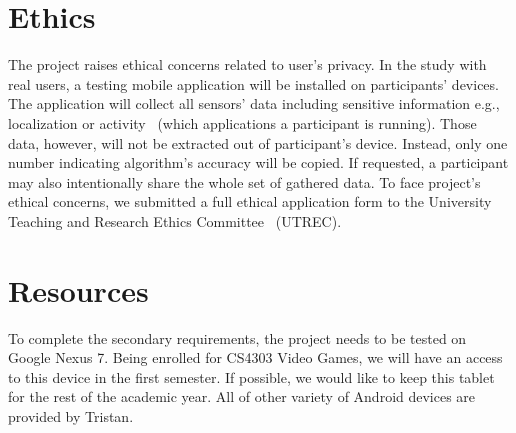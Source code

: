 \documentclass[a4page]{article}
\begin{document}
\section{Ethics}
	The project raises ethical concerns related to user's privacy. In the study with real users, a testing mobile application will be installed on participants' devices. The application will collect all sensors' data including sensitive information e.g., localization or activity~ (which applications a participant is running). Those data, however, will not be extracted out of participant's device. Instead, only one number indicating algorithm's accuracy will be copied. If requested, a participant may also intentionally share the whole set of gathered data. To face project's ethical concerns, we submitted a full ethical application form to the University Teaching and Research Ethics Committee~ (UTREC).
    
\section{Resources}
To complete the secondary requirements, the project needs to be tested on Google Nexus 7. Being enrolled for CS4303 Video Games, we will have an access to this device in the first semester. If possible, we would like to keep this tablet for the rest of the academic year. All of other variety of Android devices are provided by Tristan.


\end{document}
